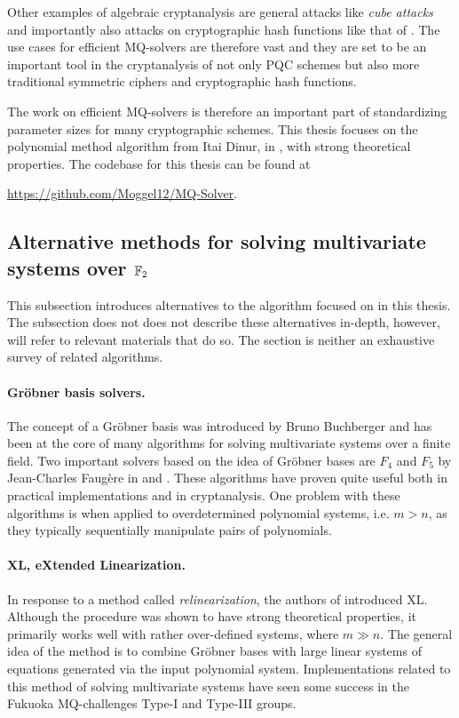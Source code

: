 Other examples of algebraic cryptanalysis are general attacks like \textit{cube attacks} \cite{Videau2011} and importantly also attacks on cryptographic hash functions like that of \cite{fse-2011-23547}. The use cases for efficient MQ-solvers are therefore vast and they are set to be an important tool in the cryptanalysis of not only PQC schemes but also more traditional symmetric ciphers and cryptographic hash functions. 

The work on efficient MQ-solvers is therefore an important part of standardizing parameter sizes for many cryptographic schemes. This thesis focuses on the polynomial method algorithm from Itai Dinur, in \cite{eurocrypt-2021-30841}, with strong theoretical properties. The codebase for this thesis can be found at 
\begin{center}
    \url{https://github.com/Moggel12/MQ-Solver}.
\end{center}

\subsection{Alternative methods for solving multivariate systems over $\mathbb{F}_2$}
This subsection introduces alternatives to the algorithm focused on in this thesis. The subsection does not does not describe these alternatives in-depth, however, will refer to relevant materials that do so. The section is neither an exhaustive survey of related algorithms.

\paragraph{Gröbner basis solvers.} The concept of a Gröbner basis was introduced by Bruno Buchberger and has been at the core of many algorithms for solving multivariate systems over a finite field. Two important solvers based on the idea of Gröbner bases are $F_4$ and $F_5$ by Jean-Charles Faugère in \cite{FAUGERE199961} and \cite{10.1145/780506.780516}. These algorithms have proven quite useful both in practical implementations and in cryptanalysis. One problem with these algorithms is when applied to overdetermined polynomial systems, i.e. $m > n$, as they typically sequentially manipulate pairs of polynomials. 

\paragraph{XL, eXtended Linearization.} In response to a method called \textit{relinearization}, the authors of \cite{eurocrypt-2000-2187} introduced XL. Although the procedure was shown to have strong theoretical properties, it primarily works well with rather over-defined systems, where $m \gg n$. The general idea of the method is to combine Gröbner bases with large linear systems of equations generated via the input polynomial system. Implementations related to this method of solving multivariate systems have seen some success in the Fukuoka MQ-challenges Type-I and Type-III groups. 

